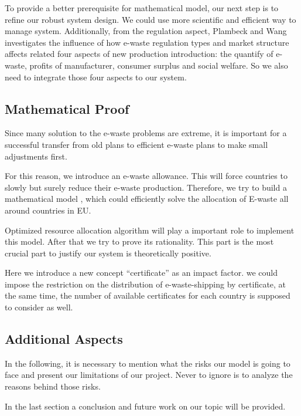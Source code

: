 \documentclass[sigchi-a, authorversion]{acmart}
\begin{document}
To provide a better prerequisite for mathematical model, our next step is to refine our robust system design. 
We could use more scientific and efficient way \cite{shah2015overview}
to manage system. Additionally, from the regulation aspect, Plambeck and Wang 
\cite{plambeck2009effects} investigates the influence of how e-waste regulation 
types and market structure affects related four aspects of new production introduction: 
the quantify of e-waste, profits of manufacturer, consumer surplus and social welfare. 
So we also need to integrate those four aspects to our system.

\subsection{Mathematical Proof}

Since many solution to the e-waste problems are extreme, it is important for a 
successful transfer from old plans to efficient e-waste plans to make small 
adjustments first. 

For this reason, we introduce an e-waste allowance\cite{watanabe2005european}. 
This will force countries to slowly but surely reduce their e-waste production. 
Therefore, we try to build a mathematical model \cite{global-perspective}, which 
could efficiently solve the allocation of E-waste all around countries in EU. 

Optimized resource allocation algorithm will play a important role to implement 
this model.  After that we try to prove its rationality. This part is the most 
crucial part to justify our system is theoretically positive.

Here we introduce a new concept ``certificate'' as an impact factor. we could 
impose the restriction on the distribution of e-waste-shipping by certificate, 
at the same time,  the number of available certificates for each country is 
supposed to consider as well.

\subsection{Additional Aspects}

In the following, it is necessary to mention what the risks our model is going 
to face and present our limitations of our project. Never to ignore is to analyze 
the reasons behind those risks.

In the last section a conclusion and future work on our topic will be provided.



\end{document}
